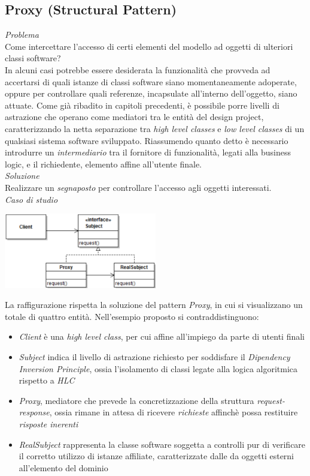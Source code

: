 \documentclass{article}
\begin{document}
\subsection*{Proxy (Structural Pattern)}
\large
\textit{Problema}\\
Come intercettare l'accesso di certi elementi del modello ad oggetti di ulteriori classi software?\vspace*{14pt}\\
In alcuni casi potrebbe essere desiderata la funzionalità che provveda ad accertarsi di quali istanze di classi software siano momentaneamente adoperate, oppure per controllare quali referenze, incapsulate all'interno dell'oggetto, siano attuate. Come già ribadito in capitoli precedenti, è possibile porre livelli di astrazione che operano come mediatori tra le entità del design project, caratterizzando la netta separazione tra \textit{high level classes} e \textit{low level classes} di un qualsiasi sistema software sviluppato. Riassumendo quanto detto è necessario introdurre un \textit{intermediario} tra il fornitore di funzionalità, legati alla business logic, e il richiedente, elemento affine all'utente finale.\vspace*{14pt}\\
\textit{Soluzione}\\
Realizzare un \textit{segnaposto} per controllare l'accesso agli oggetti interessati.\vspace*{14pt}\\
\textit{Caso di studio}\\
\begin{center}
    \includegraphics[width=0.5\textwidth]{foto 1.png}
\end{center}
La raffigurazione rispetta la soluzione del pattern \textit{Proxy}, in cui si visualizzano un totale di quattro entità. Nell'esempio proposto si contraddistinguono:
\begin{itemize}[label={-}]
    \itemsep0em
\item \textit{Client} è una \textit{high level class}, per cui affine all'impiego da parte di utenti finali
    \item \textit{Subject} indica il livello di astrazione richiesto per soddisfare il \textit{Dipendency Inversion Principle}, ossia l'isolamento di classi legate alla logica algoritmica rispetto a \textit{HLC}
    \item \textit{Proxy}, mediatore che prevede la concretizzazione della struttura \textit{request-response}, ossia rimane in attesa di ricevere \textit{richieste} affinchè possa restituire \textit{risposte inerenti}
    \item \textit{RealSubject} rappresenta la classe software soggetta a controlli pur di verificare il corretto utilizzo di istanze affiliate, caratterizzate dalle \textit{ } da oggetti esterni all'elemento del dominio
\end{itemize}
\end{document}
